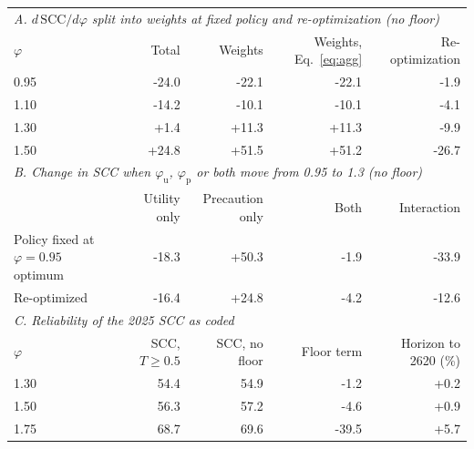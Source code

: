 \begin{tabular}{lrrrr}
\toprule
\multicolumn{5}{l}{\emph{A. $d\,\mathrm{SCC}/d\varphi$ split into weights at fixed policy and re-optimization (no floor)}} \\
$\varphi$ & Total & Weights & Weights, Eq.~\eqref{eq:agg} & Re-optimization \\
\midrule
0.95 & -24.0 & -22.1 & -22.1 & -1.9 \\
1.10 & -14.2 & -10.1 & -10.1 & -4.1 \\
1.30 & +1.4 & +11.3 & +11.3 & -9.9 \\
1.50 & +24.8 & +51.5 & +51.2 & -26.7 \\
\midrule
\multicolumn{5}{l}{\emph{B. Change in SCC when $\varphi_{\mathrm u}$, $\varphi_{\mathrm p}$ or both move from 0.95 to 1.3 (no floor)}} \\
 & Utility only & Precaution only & Both & Interaction \\
\midrule
Policy fixed at $\varphi = 0.95$ optimum & -18.3 & +50.3 & -1.9 & -33.9 \\
Re-optimized & -16.4 & +24.8 & -4.2 & -12.6 \\
\midrule
\multicolumn{5}{l}{\emph{C. Reliability of the 2025 SCC as coded}} \\
$\varphi$ & SCC, $T \ge 0.5$ & SCC, no floor & Floor term & Horizon to 2620 (\%) \\
\midrule
1.30 & 54.4 & 54.9 & -1.2 & +0.2 \\
1.50 & 56.3 & 57.2 & -4.6 & +0.9 \\
1.75 & 68.7 & 69.6 & -39.5 & +5.7 \\
\bottomrule
\end{tabular}
